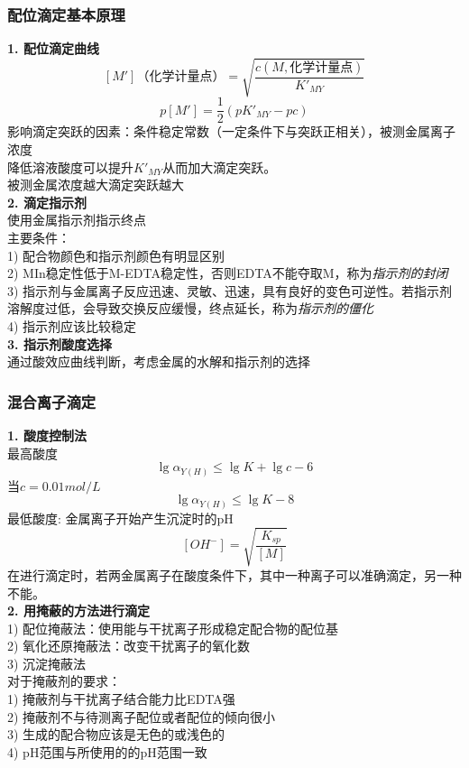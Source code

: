 \documentclass[utf8,a4paper,12pt]{ctexart}
\begin{document}
\subsubsection{配位滴定基本原理}
{\bf 1. 配位滴定曲线}\\
\[[M']\text{（化学计量点）} = \sqrt{\frac{c(M,\text{化学计量点})}{K'_{MY}}}\]
\[p[M'] = \frac{1}{2}(pK'_{MY} - pc)\]
影响滴定突跃的因素：条件稳定常数（一定条件下与突跃正相关），被测金属离子浓度\\
降低溶液酸度可以提升$K'_{MY}$从而加大滴定突跃。\\
被测金属浓度越大滴定突跃越大\\
{\bf 2. 滴定指示剂}\\
使用金属指示剂指示终点\\
主要条件：\\
1) 配合物颜色和指示剂颜色有明显区别\\
2) MIn稳定性低于M-EDTA稳定性，否则EDTA不能夺取M，称为\emph{指示剂的封闭}\\
3) 指示剂与金属离子反应迅速、灵敏、迅速，具有良好的变色可逆性。若指示剂溶解度过低，会导致交换反应缓慢，终点延长，称为\emph{指示剂的僵化}\\
4) 指示剂应该比较稳定\\
{\bf 3. 指示剂酸度选择}\\
通过酸效应曲线判断，考虑金属的水解和指示剂的选择\\
\subsubsection{混合离子滴定}
{\bf 1. 酸度控制法}\\
最高酸度\\
\[\lg\alpha_{Y(H)}\leq \lg K + \lg c - 6\]
当$c = 0.01 mol/L$
\[\lg\alpha_{Y(H)}\leq \lg K - 8\]
最低酸度: 金属离子开始产生沉淀时的pH\\
\[[OH^{-}] = \sqrt{\frac{K_{sp}}{[M]}}\]
在进行滴定时，若两金属离子在酸度条件下，其中一种离子可以准确滴定，另一种不能。\\
{\bf 2. 用掩蔽的方法进行滴定}\\
1) 配位掩蔽法：使用能与干扰离子形成稳定配合物的配位基\\
2) 氧化还原掩蔽法：改变干扰离子的氧化数\\
3) 沉淀掩蔽法\\
对于掩蔽剂的要求：\\
1) 掩蔽剂与干扰离子结合能力比EDTA强\\
2) 掩蔽剂不与待测离子配位或者配位的倾向很小\\
3) 生成的配合物应该是无色的或浅色的\\
4) pH范围与所使用的的pH范围一致
\end{document}
